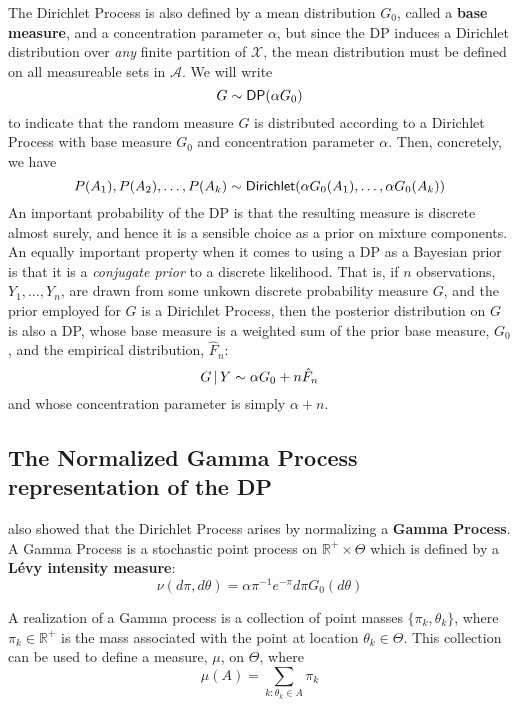 The Dirichlet Process is also defined by a mean distribution $G_0$, called a
{\bf base measure}, and a
concentration parameter $\alpha$, but since the DP induces a Dirichlet
distribution over {\em any} finite partition of $\mathcal{X}$, the
mean distribution must be defined on all measureable
sets in $\mathcal{A}$.  We will write
\begin{equation}
G \sim \mathsf{DP}(\alpha G_0)
\end{equation}
to indicate that the random measure $G$ is distributed according to a
Dirichlet Process with base measure $G_0$ and concentration parameter $\alpha$.
Then, concretely, we have
\begin{equation*}
    P(A_1), P(A_2), \dots, P(A_k) \sim \mathsf{Dirichlet}(\alpha G_0(A_1), \dots,
      \alpha G_0(A_k))
\end{equation*}
An important probability of the DP is that the resulting measure is
discrete almost surely, and hence it is a sensible choice as a prior
on mixture components.  An equally important property when it comes to
using a DP as a Bayesian prior is that it is a {\em conjugate prior}
to a discrete likelihood. That is, if $n$ observations, $Y_1, \dots,
Y_n$, are drawn from
some unkown discrete probability measure $G$, and the prior employed
for $G$ is a Dirichlet Process, then the posterior distribution on $G$
is also a DP, whose base measure is a weighted sum of the prior base
measure, $G_0$, and the empirical distribution, $\hat{F}_n$:
\begin{equation}
  \label{eq:4}
  G \, \vert \, Y \sim \alpha G_0 + n \hat{F}_n
\end{equation}
and whose concentration parameter is simply $\alpha + n$.

\subsection{The Normalized Gamma Process representation of the DP}
\label{sec:norm-gamma-proc}

\citet{ferguson1973bayesian} also showed that the Dirichlet Process
arises by normalizing a {\bf Gamma Process}.    
A Gamma Process is a stochastic point process on $\mathbb{R}^{+} \times
  \Theta$ which is defined by a {\bf L\'evy intensity measure}:
  \begin{equation}
    \label{eq:8}
    \nu(d\pi, d\theta) = \alpha \pi^{-1} e^{-\pi} d\pi G_0(d\theta)
  \end{equation}

  A realization of a Gamma process is a collection of point masses
  $\{\pi_k, \theta_k\}$, where $\pi_k \in \mathbb{R}^{+}$ is the mass
  associated with the point at location $\theta_k \in \Theta$.  This
  collection can be used to define a measure, $\mu$, on $\Theta$,
  where
  \begin{equation}
    \label{eq:3}
    \mu(A) = \sum_{k: \theta_k \in A} \pi_k
  \end{equation}

